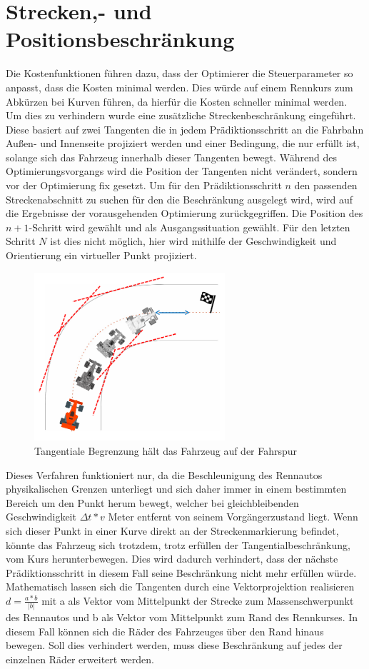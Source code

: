 \documentclass{like}
\begin{document}
\section{Strecken,- und Positionsbeschränkung}
Die Kostenfunktionen führen dazu, dass der Optimierer die Steuerparameter so anpasst, dass die Kosten minimal werden. Dies würde auf einem Rennkurs zum Abkürzen bei Kurven führen, da hierfür die Kosten schneller minimal werden. Um dies zu verhindern wurde eine zusätzliche Streckenbeschränkung eingeführt. Diese basiert auf zwei Tangenten die in jedem Prädiktionsschritt an die Fahrbahn Außen- und Innenseite projiziert werden und einer Bedingung, die nur erfüllt ist, solange sich das Fahrzeug innerhalb dieser Tangenten bewegt. Während des Optimierungsvorgangs wird die Position der Tangenten nicht verändert, sondern vor der Optimierung fix gesetzt. Um für den Prädiktionsschritt \(n\) den passenden Streckenabschnitt zu suchen für den die Beschränkung ausgelegt wird, wird auf die Ergebnisse der vorausgehenden Optimierung zurückgegriffen. Die Position des $n+1$-Schritt wird gewählt und als Ausgangssituation gewählt. Für den letzten Schritt \(N\) ist dies nicht möglich, hier wird mithilfe der Geschwindigkeit und Orientierung ein virtueller Punkt projiziert.   

\begin{figure}[ht!]
	\centering
	\includegraphics[width=200pt]{Abbildungen/tangentialConstraint.png}
	\caption{Tangentiale Begrenzung hält das Fahrzeug auf der Fahrspur}
	\label{fig:costGoalDist}
\end{figure}
Dieses Verfahren funktioniert nur, da die Beschleunigung des Rennautos physikalischen Grenzen unterliegt und sich daher immer in einem bestimmten Bereich um den Punkt herum bewegt, welcher bei gleichbleibenden Geschwindigkeit $\Delta t * v$ Meter entfernt von seinem Vorgängerzustand liegt. Wenn sich dieser Punkt in einer Kurve direkt an der Streckenmarkierung befindet, könnte das Fahrzeug sich trotzdem, trotz erfüllen der Tangentialbeschränkung, vom Kurs herunterbewegen. Dies wird dadurch verhindert, dass der nächste Prädiktionsschritt in diesem Fall seine Beschränkung nicht mehr erfüllen würde.
Mathematisch lassen sich die Tangenten durch eine Vektorprojektion realisieren\\
$d = \frac{a*b}{|b|}$ mit a als Vektor vom Mittelpunkt der Strecke zum Massenschwerpunkt des Rennautos und b als Vektor vom Mittelpunkt zum Rand des Rennkurses. In diesem Fall können sich die Räder des Fahrzeuges über den Rand hinaus bewegen. Soll dies verhindert werden, muss diese Beschränkung auf jedes der einzelnen Räder erweitert werden.
\end{document}
